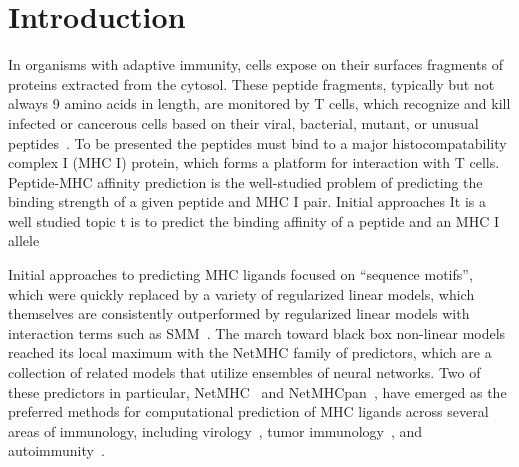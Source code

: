 \section{Introduction}
In organisms with adaptive immunity, cells expose on their surfaces fragments of proteins extracted from the cytosol. These peptide fragments, typically but not always 9 amino acids in length, are monitored by T cells, which recognize and kill infected or cancerous cells based on their viral, bacterial, mutant, or unusual peptides~\cite{Anderson_2004}. To be presented the peptides must bind to a major histocompatability complex I (MHC I) protein, which forms a platform for interaction with T cells. Peptide-MHC affinity prediction is the well-studied problem of predicting the binding strength of a given peptide and MHC I pair\cite{Lundegaard_2007}. Initial approaches It is a well studied topic t  is to predict the binding affinity of a peptide and an MHC I allele 



Initial approaches to predicting MHC ligands focused on ``sequence motifs''\cite{Sette_1989}, which were quickly replaced by a variety of regularized linear models, which themselves are consistently outperformed by regularized linear models with interaction terms such as SMM~\cite{Peters_2003}. The march toward black box non-linear models reached its local maximum with the NetMHC family of predictors, which are a collection of related models that utilize ensembles of neural networks. Two of these predictors in particular, NetMHC~\cite{Lundegaard_2008} and NetMHCpan~\cite{Nielsen_2007}, have emerged as the preferred methods for computational prediction of MHC ligands across several areas of immunology, including virology~\cite{Lund_2011}, tumor immunology~\cite{Gubin_2015}, and autoimmunity~\cite{Abreu_2012}. 





